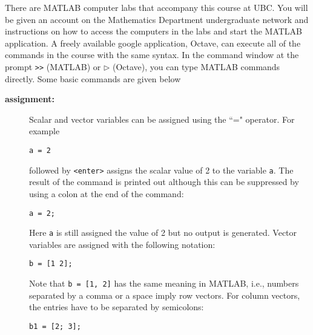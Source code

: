 There are MATLAB computer labs that accompany this course at UBC. You will be given 
an account on the Mathematics Department undergraduate network and instructions 
on how to access the computers in the labs and start the MATLAB application. 
A freely available google application, Octave, can execute all of the commands in the course 
with the same syntax. 
In the command window at the prompt {\tt >>} (MATLAB) or $\rhd$ (Octave), 
you can type MATLAB commands directly. Some basic commands are given below 
\begin{description}
\item[{\bf assignment:}] Scalar and vector variables can be assigned 
using the ``=" operator. For example 
\begin{verbatim}
a = 2 
\end{verbatim}
followed by {\tt <enter>} 
assigns the scalar value of 2 to the variable {\tt a}. The result 
of the command is printed out although this can be suppressed by using a 
colon at the end of the command:
\begin{verbatim}
a = 2;
\end{verbatim}
Here {\tt a} is still assigned the value of 2 but no output is generated. 
Vector variables are assigned with the following notation:
\begin{verbatim}
b = [1 2];
\end{verbatim}
Note that {\tt b = [1, 2]} has the same meaning in MATLAB, i.e., numbers separated by a comma or a space imply row vectors. For column vectors, the entries have to be separated by semicolons:
\begin{verbatim}
b1 = [2; 3];
\end{verbatim}


\end{description}
